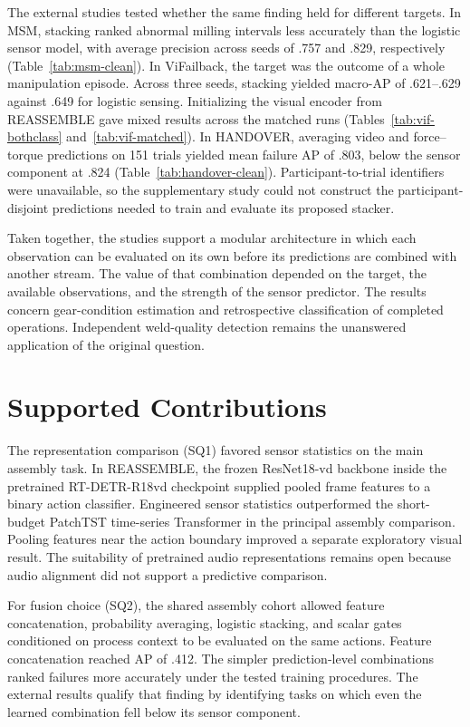 The external studies tested whether the same finding held for different targets. In MSM, stacking ranked abnormal milling intervals less accurately than the logistic sensor model, with average precision across seeds of .757 and .829, respectively (Table~\ref{tab:msm-clean}). In ViFailback, the target was the outcome of a whole manipulation episode. Across three seeds, stacking yielded macro-AP of .621--.629 against .649 for logistic sensing. Initializing the visual encoder from REASSEMBLE gave mixed results across the matched runs (Tables~\ref{tab:vif-bothclass} and~\ref{tab:vif-matched}). In HANDOVER, averaging video and force--torque predictions on 151 trials yielded mean failure AP of .803, below the sensor component at .824 (Table~\ref{tab:handover-clean}). Participant-to-trial identifiers were unavailable, so the supplementary study could not construct the participant-disjoint predictions needed to train and evaluate its proposed stacker.

Taken together, the studies support a modular architecture in which each observation can be evaluated on its own before its predictions are combined with another stream. The value of that combination depended on the target, the available observations, and the strength of the sensor predictor. The results concern gear-condition estimation and retrospective classification of completed operations. Independent weld-quality detection remains the unanswered application of the original question.

\section{Supported Contributions}
The representation comparison (SQ1) favored sensor statistics on the main assembly task. In REASSEMBLE, the frozen ResNet18-vd backbone inside the pretrained RT-DETR-R18vd checkpoint supplied pooled frame features to a binary action classifier. Engineered sensor statistics outperformed the short-budget PatchTST time-series Transformer in the principal assembly comparison. Pooling features near the action boundary improved a separate exploratory visual result. The suitability of pretrained audio representations remains open because audio alignment did not support a predictive comparison.

For fusion choice (SQ2), the shared assembly cohort allowed feature concatenation, probability averaging, logistic stacking, and scalar gates conditioned on process context to be evaluated on the same actions. Feature concatenation reached AP of .412. The simpler prediction-level combinations ranked failures more accurately under the tested training procedures. The external results qualify that finding by identifying tasks on which even the learned combination fell below its sensor component.

